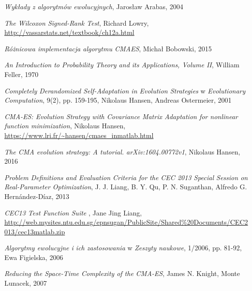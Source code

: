 \documentclass{mini}
\begin{document}
\pagebreak

\begin{thebibliography}{9}

\emph{Wykłady z algorytmów ewolucyjnych}, Jarosław Arabas, 2004

\emph{The Wilcoxon Signed-Rank Test}, Richard Lowry, \url{http://vassarstats.net/textbook/ch12a.html}

\emph{Różnicowa implementacja algorytmu CMAES}, Michał Bobowski, 2015

\emph{An Introduction to Probability Theory and its Applications, Volume II}, William Feller, 1970

\emph{Completely Derandomized Self-Adaptation in Evolution Strategies} w \emph{Evolutionary Computation}, 9(2), pp. 159-195, Nikolaus Hansen, Andreas Ostermeier, 2001

\emph{CMA-ES: Evolution Strategy with Covariance Matrix Adaptation for nonlinear function minimization}, Nikolaus Hansen, \url{https://www.lri.fr/~hansen/cmaes\_inmatlab.html}

\emph{The CMA evolution strategy: A tutorial. arXiv:1604.00772v1}, Nikolaus Hansen, 2016

\emph{Problem Definitions and Evaluation Criteria for the CEC 2013 Special Session on Real-Parameter Optimization}, J. J. Liang, B. Y. Qu, P. N. Suganthan, Alfredo G. Hernández-Díaz, 2013

\emph{CEC13 Test Function Suite }, Jane Jing Liang, \url{http://web.mysites.ntu.edu.sg/epnsugan/PublicSite/Shared%20Documents/CEC2013/cec13matlab.zip}

\emph{Algorytmy ewolucyjne i ich zastosowania} w \emph{Zeszyty naukowe}, 1/2006, pp. 81-92, Ewa Figielska, 2006

\emph{Reducing the Space-Time Complexity of the CMA-ES}, James N. Knight, Monte Lunacek, 2007

\end{thebibliography}

\makestatement
\end{document}
